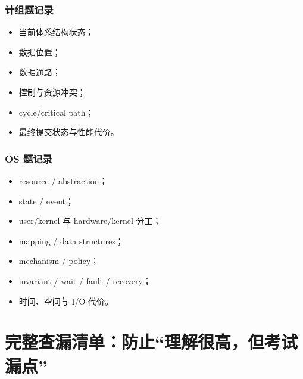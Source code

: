 \documentclass[11pt,a4paper,openany]{ctexbook}
\begin{document}
\subsection{计组题记录}
\begin{itemize}
  \item 当前体系结构状态；
  \item 数据位置；
  \item 数据通路；
  \item 控制与资源冲突；
  \item cycle/critical path；
  \item 最终提交状态与性能代价。
\end{itemize}

\subsection{OS 题记录}
\begin{itemize}
  \item resource / abstraction；
  \item state / event；
  \item user/kernel 与 hardware/kernel 分工；
  \item mapping / data structures；
  \item mechanism / policy；
  \item invariant / wait / fault / recovery；
  \item 时间、空间与 I/O 代价。
\end{itemize}

\chapter{完整查漏清单：防止“理解很高，但考试漏点”}
\end{document}
